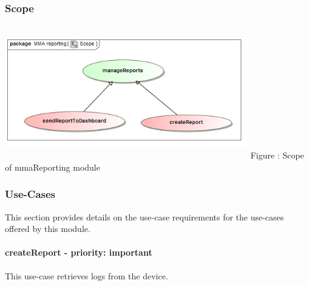 \documentclass[hidelinks, 12pt, oneside]{article}
\begin{document}
	\subsubsection{Scope}
	\includegraphics[width=400px,height=220px]{img/scopeReports.jpg}
			Figure : Scope of mmaReporting module
	\subsubsection{Use-Cases}
			This section provides details on the use-case requirements for the use-cases offered by this module.
		\paragraph{ createReport - priority: important}
		This use-case retrieves logs from the device.
\end{document}

